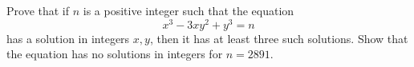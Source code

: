 Prove that if $n$ is a positive integer such that the equation \[ x^3-3xy^2+y^3=n \] has a solution in integers $x,y$,  then it has at least three such solutions. Show that the equation has no solutions in integers for $n=2891$.